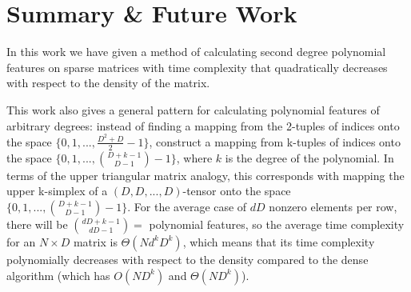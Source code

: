 \documentclass[11pt,twocolumn]{article}
\begin{document}
\section{Summary \& Future Work}
In this work we have given a method of calculating second degree polynomial features on sparse matrices
with time complexity that quadratically decreases with respect to the density of the matrix.

This work also gives a general pattern for calculating polynomial features of arbitrary degrees:
instead of finding a mapping from the 2-tuples of indices onto the space $\{0, 1, ..., \frac{D^2+D}{2}-1\}$,
construct a mapping from k-tuples of indices onto the space $\{0, 1, ..., \binom{D+k-1}{D-1}-1\}$, where $k$ is the degree of the polynomial.
In terms of the upper triangular matrix analogy, this corresponds with mapping the upper k-simplex of a $(D, D, ..., D)$-tensor onto
the space $\{0, 1, ..., \binom{D+k-1}{D-1}-1\}$. For the average case of $dD$ nonzero elements per row, 
there will be $\binom{dD+k-1}{dD-1} = $ polynomial features, so the average time complexity for an $N \times D$ matrix
is $\Theta(Nd^kD^k)$, which means that its time complexity polynomially decreases with respect to the density
compared to the dense algorithm (which has $O(ND^k)$ and $\Theta(ND^k)$).

\vskip 0.2in
{}

\end{document}
